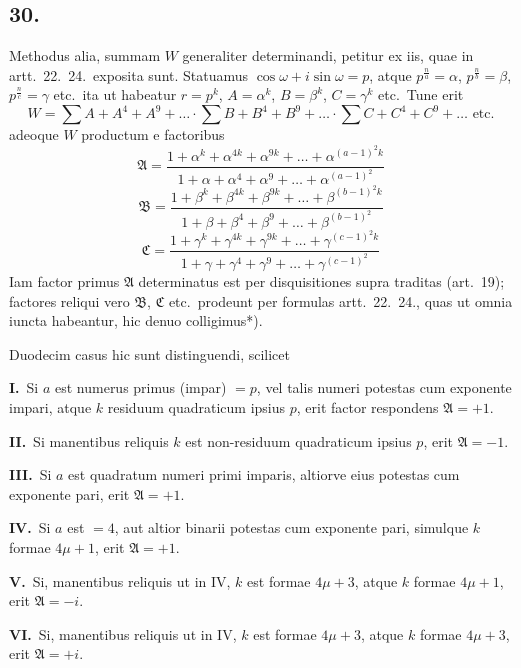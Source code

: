 \documentclass[12pt,a4paper]{article}
\theoremstyle{plain}
\begin{document}
\subsection*{30.}

Methodus alia, summam $W$ generaliter determinandi, petitur ex iis, quae in artt.\ 22.\ 24.\ exposita sunt. Statuamus $\cos \omega + i \sin \omega = p$, atque $p^{\frac{n}{a}} = \alpha$, $p^{\frac{n}{b}} = \beta$, $p^{\frac{n}{c}} = \gamma$ etc.\ ita ut habeatur $r = p^k$, $A = \alpha^k$, $B = \beta^k$, $C = \gamma^k$ etc.\ Tune erit
\[
W = \sum A + A^4 + A^9 + \ldots \cdot \sum B + B^4 + B^9 + \ldots \cdot \sum C + C^4 + C^9 + \ldots \text{ etc.}
\]
adeoque $W$ productum e factoribus
\[
\mathfrak{A} = \frac{1 + \alpha^k + \alpha^{4k} + \alpha^{9k} + \ldots + \alpha^{(a-1)^2 k}}{1 + \alpha + \alpha^4 + \alpha^9 + \ldots + \alpha^{(a-1)^2}}
\]
\[
\mathfrak{B} = \frac{1 + \beta^k + \beta^{4k} + \beta^{9k} + \ldots + \beta^{(b-1)^2 k}}{1 + \beta + \beta^4 + \beta^9 + \ldots + \beta^{(b-1)^2}}
\]
\[
\mathfrak{C} = \frac{1 + \gamma^k + \gamma^{4k} + \gamma^{9k} + \ldots + \gamma^{(c-1)^2 k}}{1 + \gamma + \gamma^4 + \gamma^9 + \ldots + \gamma^{(c-1)^2}}
\]
Iam factor primus $\mathfrak{A}$ determinatus est per disquisitiones supra traditas (art.\ 19); factores reliqui vero $\mathfrak{B}$, $\mathfrak{C}$ etc.\ prodeunt per formulas artt.\ 22.\ 24., quas ut omnia iuncta habeantur, hic denuo colligimus*).

Duodecim casus hic sunt distinguendi, scilicet

\medskip
\noindent\textbf{I.}\ Si $a$ est numerus primus (impar) $= p$, vel talis numeri potestas cum exponente impari, atque $k$ residuum quadraticum ipsius $p$, erit factor respondens $\mathfrak{A} = +1$.

\medskip
\noindent\textbf{II.}\ Si manentibus reliquis $k$ est non-residuum quadraticum ipsius $p$, erit $\mathfrak{A} = -1$.

\medskip
\noindent\textbf{III.}\ Si $a$ est quadratum numeri primi imparis, altiorve eius potestas cum exponente pari, erit $\mathfrak{A} = +1$.

\medskip
\noindent\textbf{IV.}\ Si $a$ est $= 4$, aut altior binarii potestas cum exponente pari, simulque $k$ formae $4\mu+1$, erit $\mathfrak{A} = +1$.

\medskip
\noindent\textbf{V.}\ Si, manentibus reliquis ut in IV, $k$ est formae $4\mu+3$, atque $k$ formae $4\mu+1$, erit $\mathfrak{A} = -i$.

\medskip
\noindent\textbf{VI.}\ Si, manentibus reliquis ut in IV, $k$ est formae $4\mu+3$, atque $k$ formae $4\mu+3$, erit $\mathfrak{A} = +i$.
\end{document}
